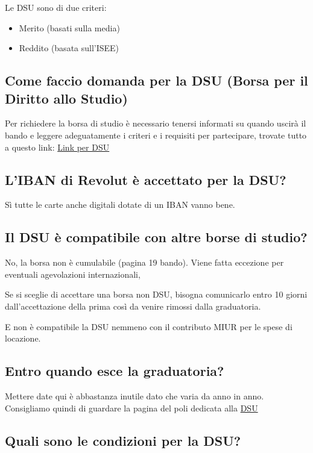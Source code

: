 \documentclass[legal]{polinetwork}
\begin{document}
Le DSU sono di due criteri:

\begin{itemize}
  \item Merito (basati sulla media)
  \item Reddito (basata sull'ISEE)
\end{itemize}


\subsection{Come faccio domanda per la DSU (Borsa per il Diritto allo Studio)}


Per richiedere la borsa di studio è necessario tenersi informati su quando uscirà il bando e leggere adeguatamente i criteri e i requisiti per partecipare, trovate tutto a questo link: \href{https://www.polimi.it/studenti/tasse-borse-e-agevolazioni/diritto-allo-studio}{Link per DSU}

\subsection{L'IBAN di Revolut è accettato per la DSU?}


Sì tutte le carte anche digitali dotate di un IBAN vanno bene.

\subsection{Il DSU è compatibile con altre borse di studio?}


No, la borsa non è cumulabile (pagina 19 bando). Viene fatta eccezione per eventuali agevolazioni internazionali,

Se si sceglie di accettare una borsa non DSU, bisogna comunicarlo entro 10 giorni dall'accettazione della prima così da venire rimossi dalla graduatoria.

E non è compatibile la DSU nemmeno con il contributo MIUR per le spese di locazione.


\subsection{Entro quando esce la graduatoria?}


Mettere date qui è abbastanza inutile dato che varia da anno in anno. Consigliamo quindi di guardare la pagina del poli dedicata alla \href{https://www.polimi.it/studenti/tasse-borse-e-agevolazioni/diritto-allo-studio}{DSU}

\subsection{Quali sono le condizioni per la DSU?}
\end{document}
